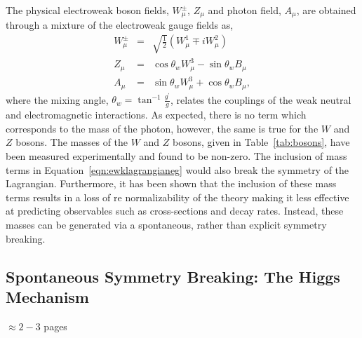 The physical electroweak boson fields, $W_{\mu}^{\pm}$, $Z_{\mu}$ and photon field, 
$A_{\mu}$, are obtained through a mixture of the electroweak gauge fields as,
\begin{eqnarray}
W_{\mu}^{\pm} & = &  \sqrt{\frac{1}{2}} \left( W_{\mu}^{1} \mp i W_{\mu}^{2} \right) \nonumber \\
Z_{\mu} &  = & \cos\theta_{w} W_{\mu}^{3} - \sin\theta_{w} B_{\mu} \nonumber \\
A_{\mu} &  = & \sin\theta_{w} W_{\mu}^{3} + \cos\theta_{w} B_{\mu},
\label{eqn:ewkbosons}
\end{eqnarray}
where the mixing angle, $\theta_{w} = \tan^{-1}{\frac{g^{\prime}}{g}}$, relates
the couplings of the weak neutral and electromagnetic interactions.
As expected, there is no term which corresponds to the mass of the photon, however,
the same is true for the $W$ and $Z$ bosons. The masses of the $W$ and $Z$ bosons, 
given in Table~\ref{tab:bosons}, have been measured experimentally and found to be 
non-zero. The inclusion of mass terms in Equation~\ref{eqn:ewklagrangianeg} would also
break the symmetry of the Lagrangian. Furthermore, it has been shown that the inclusion
of these mass terms results in a loss of re normalizability of the theory making it  
less effective at predicting observables such as cross-sections and decay rates.
Instead, these masses can be generated via a spontaneous, rather than explicit
symmetry breaking.

\subsection{Spontaneous Symmetry Breaking: The Higgs Mechanism}
$\approx 2-3$ pages

